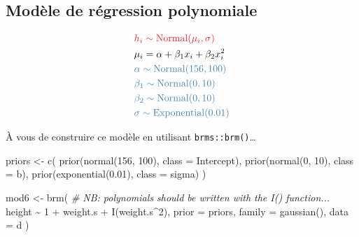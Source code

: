 \documentclass[
  a4paper,11pt,twoside,onecolumn,openright,final,oldfontcommands]{memoir}
\newenvironment{Shaded}{\begin{snugshade}}{\end{snugshade}}
\newcommand{\AttributeTok}[1]{\textcolor[rgb]{0.77,0.63,0.00}{#1}}
\newcommand{\CommentTok}[1]{\textcolor[rgb]{0.56,0.35,0.01}{\textit{#1}}}
\newcommand{\DecValTok}[1]{\textcolor[rgb]{0.00,0.00,0.81}{#1}}
\newcommand{\FloatTok}[1]{\textcolor[rgb]{0.00,0.00,0.81}{#1}}
\newcommand{\FunctionTok}[1]{\textcolor[rgb]{0.00,0.00,0.00}{#1}}
\newcommand{\NormalTok}[1]{#1}
\newcommand{\OtherTok}[1]{\textcolor[rgb]{0.56,0.35,0.01}{#1}}
\newcommand{\SpecialCharTok}[1]{\textcolor[rgb]{0.00,0.00,0.00}{#1}}
\theoremstyle{definition}
\theoremstyle{definition}
\theoremstyle{definition}
\theoremstyle{definition}
\theoremstyle{remark}
\begin{document}
\hypertarget{moduxe8le-de-ruxe9gression-polynomiale}{%
\subsection{Modèle de régression polynomiale}\label{moduxe8le-de-ruxe9gression-polynomiale}}

\[
\begin{aligned}
&\color{orangered}{h_{i} \sim \mathrm{Normal}(\mu_{i}, \sigma)} \\
&\mu_{i} = \alpha + \beta_{1} x_{i} + \beta_{2} x_{i}^{2} \\
&\color{steelblue}{\alpha \sim \mathrm{Normal}(156, 100)} \\
&\color{steelblue}{\beta_{1} \sim \mathrm{Normal}(0, 10)} \\
&\color{steelblue}{\beta_{2} \sim \mathrm{Normal}(0, 10)} \\
&\color{steelblue}{\sigma \sim \mathrm{Exponential}(0.01)} \\
\end{aligned}
\]

À vous de construire ce modèle en utilisant \texttt{brms::brm()}\ldots{}

\begin{Shaded}
\begin{Highlighting}[]
\NormalTok{priors }\OtherTok{\textless{}{-}} \FunctionTok{c}\NormalTok{(}
  \FunctionTok{prior}\NormalTok{(}\FunctionTok{normal}\NormalTok{(}\DecValTok{156}\NormalTok{, }\DecValTok{100}\NormalTok{), }\AttributeTok{class =}\NormalTok{ Intercept),}
  \FunctionTok{prior}\NormalTok{(}\FunctionTok{normal}\NormalTok{(}\DecValTok{0}\NormalTok{, }\DecValTok{10}\NormalTok{), }\AttributeTok{class =}\NormalTok{ b),}
  \FunctionTok{prior}\NormalTok{(}\FunctionTok{exponential}\NormalTok{(}\FloatTok{0.01}\NormalTok{), }\AttributeTok{class =}\NormalTok{ sigma)}
\NormalTok{  )}

\NormalTok{mod6 }\OtherTok{\textless{}{-}} \FunctionTok{brm}\NormalTok{(}
  \CommentTok{\# NB: polynomials should be written with the I() function...}
\NormalTok{  height }\SpecialCharTok{\textasciitilde{}} \DecValTok{1} \SpecialCharTok{+}\NormalTok{ weight.s }\SpecialCharTok{+} \FunctionTok{I}\NormalTok{(weight.s}\SpecialCharTok{\^{}}\DecValTok{2}\NormalTok{),}
  \AttributeTok{prior =}\NormalTok{ priors,}
  \AttributeTok{family =} \FunctionTok{gaussian}\NormalTok{(),}
  \AttributeTok{data =}\NormalTok{ d}
\NormalTok{  )}
\end{Highlighting}
\end{Shaded}
\end{document}

